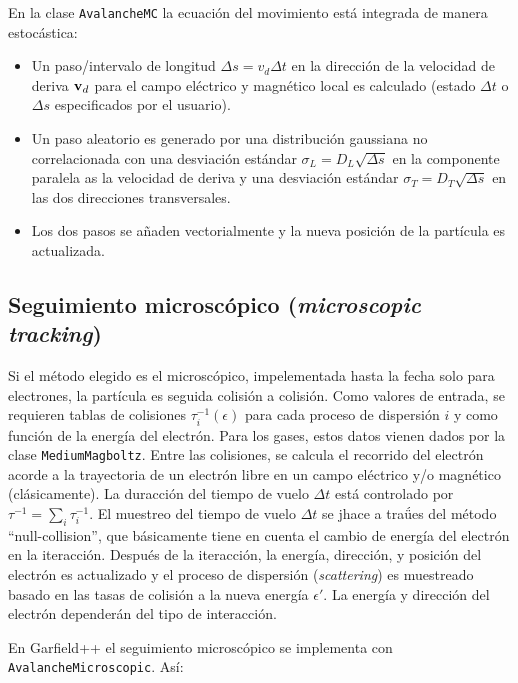 En la clase \texttt{AvalancheMC} la ecuación del movimiento está integrada de manera estocástica:

\begin{itemize}
    \item Un paso/intervalo de longitud $\Delta s = v_d \Delta t$ en la dirección de la velocidad de deriva $\mathbf{v}_d$ para el campo eléctrico y magnético local es calculado (estado $\Delta t$ o $\Delta s$ especificados por el usuario).
    \item Un paso aleatorio es generado por una distribución gaussiana no correlacionada con una desviación estándar $\sigma_L = D_L\sqrt{\Delta s}$ en la componente paralela as la velocidad de deriva y una desviación estándar $\sigma_T = D_T \sqrt{\Delta s}$ en las dos direcciones transversales. 
    \item Los dos pasos se añaden vectorialmente y la nueva posición de la partícula es actualizada.
\end{itemize}

\subsection{Seguimiento microscópico (\textit{microscopic tracking})}

Si el método elegido es el microscópico, impelementada hasta la fecha solo para electrones, la partícula es seguida colisión a colisión. Como valores de entrada, se requieren tablas de colisiones $\tau^{-1}_i (\epsilon)$ para cada proceso de dispersión $i$ y como función de la energía del electrón. Para los gases, estos datos vienen dados por la clase \texttt{MediumMagboltz}. Entre las colisiones, se calcula el recorrido del electrón acorde a la trayectoria de un electrón libre en un campo eléctrico y/o magnético (clásicamente). La duracción del tiempo de vuelo $\Delta t$ está controlado por $\tau^{-1} = \sum_i \tau^{-1}_i$. El muestreo del tiempo de vuelo $\Delta t$ se jhace a traǘes del método ``null-collision'', que básicamente tiene en cuenta el cambio de energía del electrón en la iteracción. Después de la iteracción, la energía, dirección,  y posición del electrón es actualizado y el proceso de dispersión (\textit{scattering}) es muestreado basado en las tasas de colisión a la nueva energía $\epsilon'$. La energía y dirección del electrón dependerán del tipo de interacción. 

En Garfield++ el seguimiento microscópico se implementa con \texttt{AvalancheMicroscopic}. Así: \\


